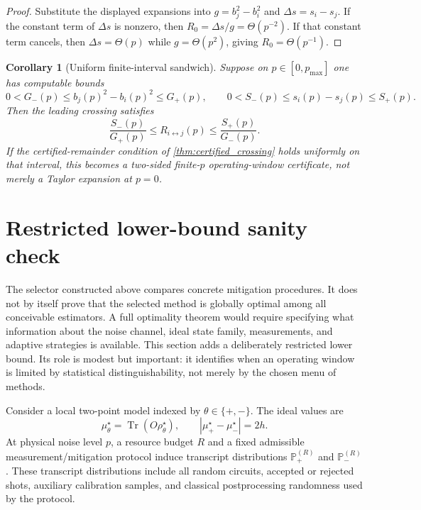 \documentclass[11pt]{article}
\newtheorem{corollary}{Corollary}
\DeclareMathOperator{\Tr}{Tr}
\newcommand{\1}{\mathbf{1}}
\newcommand{\abs}[1]{\left\lvert #1 \right\rvert}
\begin{document}
\begin{proof}
Substitute the displayed expansions into \(g=b_j^2-b_i^2\) and \(\Delta s=s_i-s_j\).  If the constant term of \(\Delta s\) is nonzero, then \(R_0=\Delta s/g=\Theta(p^{-2})\).  If that constant term cancels, then \(\Delta s=\Theta(p)\) while \(g=\Theta(p^2)\), giving \(R_0=\Theta(p^{-1})\).
\end{proof}

\begin{corollary}[Uniform finite-interval sandwich]
\label{cor:finite_interval_sandwich}
Suppose on \(p\in[0,p_{\max}]\) one has computable bounds
\begin{equation}
    0<G_-(p)\leq b_j(p)^2-b_i(p)^2\leq G_+(p),
    \qquad
    0<S_-(p)\leq s_i(p)-s_j(p)\leq S_+(p).
\end{equation}
Then the leading crossing satisfies
\begin{equation}
    \frac{S_-(p)}{G_+(p)}\leq R_{i\leftrightarrow j}(p)\leq\frac{S_+(p)}{G_-(p)}.
\end{equation}
If the certified-remainder condition of \cref{thm:certified_crossing} holds uniformly on that interval, this becomes a two-sided finite-\(p\) operating-window certificate, not merely a Taylor expansion at \(p=0\).

\end{corollary}

\section{Restricted lower-bound sanity check}
\label{sec:restricted_lower_bound}

The selector constructed above compares concrete mitigation procedures.  It does not by itself prove that the selected method is globally optimal among all conceivable estimators.  A full optimality theorem would require specifying what information about the noise channel, ideal state family, measurements, and adaptive strategies is available.  This section adds a deliberately restricted lower bound.  Its role is modest but important: it identifies when an operating window is limited by statistical distinguishability, not merely by the chosen menu of methods.

Consider a local two-point model indexed by \(\theta\in\{+,-\}\).  The ideal values are
\begin{equation}
    \mu_\theta^\star=\Tr(O\rho_\theta^\star),
    \qquad
    \abs{\mu_+^\star-\mu_-^\star}=2h.
\end{equation}
At physical noise level \(p\), a resource budget \(R\) and a fixed admissible measurement/mitigation protocol induce transcript distributions \(\mathbb P_+^{(R)}\) and \(\mathbb P_-^{(R)}\).  These transcript distributions include all random circuits, accepted or rejected shots, auxiliary calibration samples, and classical postprocessing randomness used by the protocol.
\end{document}
